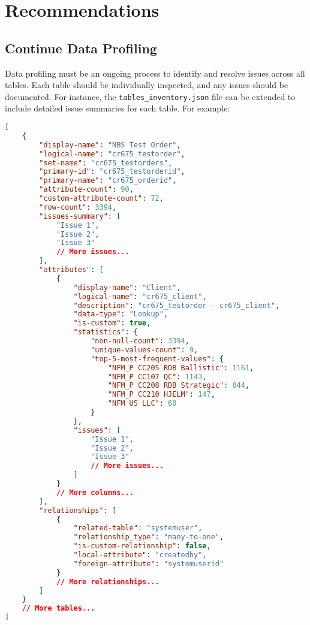 \section{Recommendations}

\subsection{Continue Data Profiling}
Data profiling must be an ongoing process to identify and resolve issues across all tables. Each table should be individually inspected, and any issues should be documented. For instance, the \texttt{tables\_inventory.json} file can be extended to include detailed issue summaries for each table. For example:

\begin{lstlisting}[language=json]
[
    {
        "display-name": "NBS Test Order",
        "logical-name": "cr675_testorder",
        "set-name": "cr675_testorders",
        "primary-id": "cr675_testorderid",
        "primary-name": "cr675_orderid",
        "attribute-count": 90,
        "custom-attribute-count": 72,
        "row-count": 3394,
        "issues-summary": [
            "Issue 1",
            "Issue 2",
            "Issue 3"
            // More issues...
        ],
        "attributes": [
            {
                "display-name": "Client",
                "logical-name": "cr675_client",
                "description": "cr675_testorder - cr675_client",
                "data-type": "Lookup",
                "is-custom": true,
                "statistics": {
                    "non-null-count": 3394,
                    "unique-values-count": 9,
                    "top-5-most-frequent-values": {
                        "NFM_P CC205 RDB Ballistic": 1161,
                        "NFM_P CC107 QC": 1143,
                        "NFM_P CC208 RDB Strategic": 844,
                        "NFM_P CC210 HJELM": 147,
                        "NFM US LLC": 60
                    }
                },
                "issues": [
                    "Issue 1",
                    "Issue 2",
                    "Issue 3"
                    // More issues...
                ]
            }
            // More columns... 
        ],
        "relationships": [
            {
                "related-table": "systemuser",
                "relationship_type": "many-to-one",
                "is-custom-relationship": false,
                "local-attribute": "createdby",
                "foreign-attribute": "systemuserid"
            }
            // More relationships...
        ]
    }
    // More tables...
]
\end{lstlisting}

